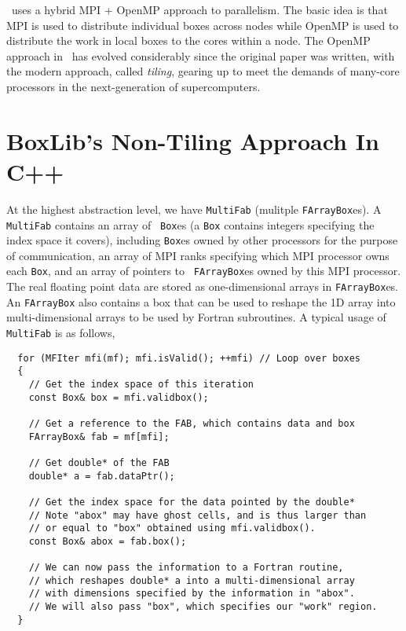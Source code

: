 \castro\ uses a hybrid MPI + OpenMP approach to parallelism.  The
basic idea is that MPI is used to distribute individual boxes across
nodes while OpenMP is used to distribute the work in local boxes to
the cores within a node.  The OpenMP approach in \castro\ has evolved
considerably since the original paper was written, with the modern
approach, called {\em tiling}, gearing up to meet the demands of
many-core processors in the next-generation of supercomputers.


\section{BoxLib's Non-Tiling Approach In C++}
\label{sec:boxlib0}

At the highest abstraction level, we have {\tt MultiFab} (mulitple
{\tt FArrayBox}es).  A {\tt MultiFab} contains an array of {\tt
  Box}es (a {\tt Box} contains integers specifying the index space it
covers), including {\tt Box}es owned by other processors for the
purpose of communication, an array of MPI ranks specifying which MPI
processor owns each {\tt Box}, and an array of pointers to {\tt
  FArrayBox}es owned by this MPI processor.  The real floating point
data are stored as one-dimensional arrays in {\tt FArrayBox}es.  An
{\tt FArrayBox} also contains a box that can be used to reshape the 1D
array into multi-dimensional arrays to be used by Fortran subroutines.
A typical usage of {\tt MultiFab} is as follows,

\begin{lstlisting}
  for (MFIter mfi(mf); mfi.isValid(); ++mfi) // Loop over boxes
  {
    // Get the index space of this iteration
    const Box& box = mfi.validbox(); 

    // Get a reference to the FAB, which contains data and box  
    FArrayBox& fab = mf[mfi];  

    // Get double* of the FAB 
    double* a = fab.dataPtr();

    // Get the index space for the data pointed by the double* 
    // Note "abox" may have ghost cells, and is thus larger than 
    // or equal to "box" obtained using mfi.validbox().
    const Box& abox = fab.box();

    // We can now pass the information to a Fortran routine,
    // which reshapes double* a into a multi-dimensional array 
    // with dimensions specified by the information in "abox".
    // We will also pass "box", which specifies our "work" region.
  }
\end{lstlisting}

